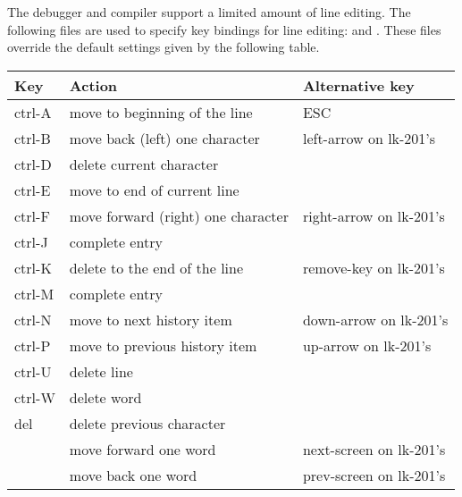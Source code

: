 The debugger and compiler support a limited amount of line editing.  The
following files are used to specify key bindings for line editing:
 and .  These files override 
the default settings given by the following table.
\begin{center}
\begin{tabular}{|l|l|l|}\hline
Key	   & Action	&Alternative key\\
\hline
ctrl-A & move to beginning of the line  	&ESC\\
ctrl-B & move back (left) one character 	&left-arrow on lk-201's\\
ctrl-D & delete current character			&\\
ctrl-E & move to end of current line		&\\
ctrl-F & move forward (right) one character &right-arrow on lk-201's\\
ctrl-J & complete entry						&\\
ctrl-K & delete to the end of the line 		&remove-key on lk-201's\\
ctrl-M & complete entry						&\\
ctrl-N & move to next history item     		&down-arrow on lk-201's\\
ctrl-P & move to previous history item 		&up-arrow on lk-201's\\
ctrl-U & delete line						&\\
ctrl-W & delete word						&\\
del    & delete previous character				&\\
	   & move forward one word				& next-screen on lk-201's\\
	   & move back one word					& prev-screen on lk-201's\\
\hline
\end{tabular}
\end{center}



